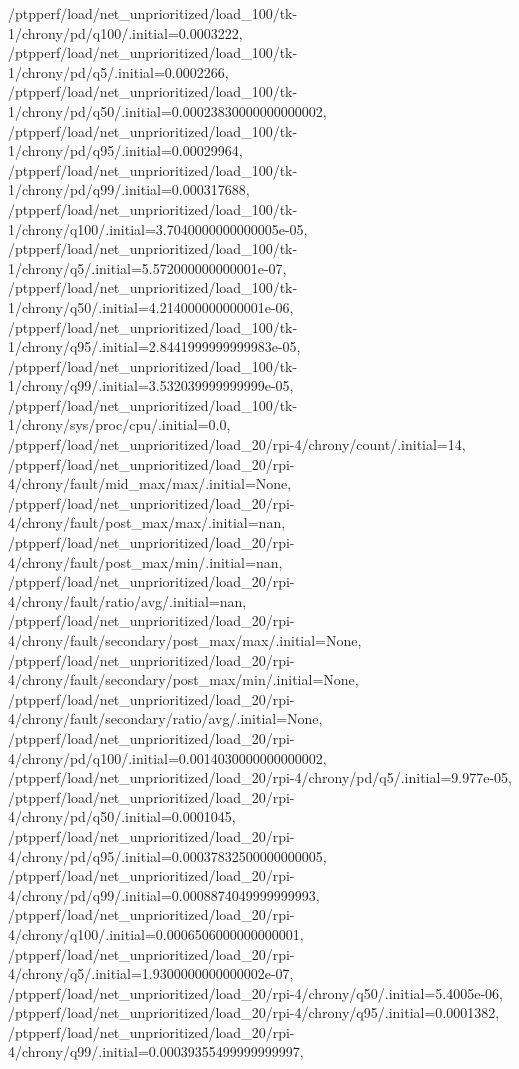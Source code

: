 {    /ptpperf/load/net_unprioritized/load_100/tk-1/chrony/pd/q100/.initial=0.0003222,
    /ptpperf/load/net_unprioritized/load_100/tk-1/chrony/pd/q5/.initial=0.0002266,
    /ptpperf/load/net_unprioritized/load_100/tk-1/chrony/pd/q50/.initial=0.00023830000000000002,
    /ptpperf/load/net_unprioritized/load_100/tk-1/chrony/pd/q95/.initial=0.00029964,
    /ptpperf/load/net_unprioritized/load_100/tk-1/chrony/pd/q99/.initial=0.000317688,
    /ptpperf/load/net_unprioritized/load_100/tk-1/chrony/q100/.initial=3.7040000000000005e-05,
    /ptpperf/load/net_unprioritized/load_100/tk-1/chrony/q5/.initial=5.572000000000001e-07,
    /ptpperf/load/net_unprioritized/load_100/tk-1/chrony/q50/.initial=4.214000000000001e-06,
    /ptpperf/load/net_unprioritized/load_100/tk-1/chrony/q95/.initial=2.8441999999999983e-05,
    /ptpperf/load/net_unprioritized/load_100/tk-1/chrony/q99/.initial=3.532039999999999e-05,
    /ptpperf/load/net_unprioritized/load_100/tk-1/chrony/sys/proc/cpu/.initial=0.0,
    /ptpperf/load/net_unprioritized/load_20/rpi-4/chrony/count/.initial=14,
    /ptpperf/load/net_unprioritized/load_20/rpi-4/chrony/fault/mid_max/max/.initial=None,
    /ptpperf/load/net_unprioritized/load_20/rpi-4/chrony/fault/post_max/max/.initial=nan,
    /ptpperf/load/net_unprioritized/load_20/rpi-4/chrony/fault/post_max/min/.initial=nan,
    /ptpperf/load/net_unprioritized/load_20/rpi-4/chrony/fault/ratio/avg/.initial=nan,
    /ptpperf/load/net_unprioritized/load_20/rpi-4/chrony/fault/secondary/post_max/max/.initial=None,
    /ptpperf/load/net_unprioritized/load_20/rpi-4/chrony/fault/secondary/post_max/min/.initial=None,
    /ptpperf/load/net_unprioritized/load_20/rpi-4/chrony/fault/secondary/ratio/avg/.initial=None,
    /ptpperf/load/net_unprioritized/load_20/rpi-4/chrony/pd/q100/.initial=0.0014030000000000002,
    /ptpperf/load/net_unprioritized/load_20/rpi-4/chrony/pd/q5/.initial=9.977e-05,
    /ptpperf/load/net_unprioritized/load_20/rpi-4/chrony/pd/q50/.initial=0.0001045,
    /ptpperf/load/net_unprioritized/load_20/rpi-4/chrony/pd/q95/.initial=0.00037832500000000005,
    /ptpperf/load/net_unprioritized/load_20/rpi-4/chrony/pd/q99/.initial=0.0008874049999999993,
    /ptpperf/load/net_unprioritized/load_20/rpi-4/chrony/q100/.initial=0.0006506000000000001,
    /ptpperf/load/net_unprioritized/load_20/rpi-4/chrony/q5/.initial=1.9300000000000002e-07,
    /ptpperf/load/net_unprioritized/load_20/rpi-4/chrony/q50/.initial=5.4005e-06,
    /ptpperf/load/net_unprioritized/load_20/rpi-4/chrony/q95/.initial=0.0001382,
    /ptpperf/load/net_unprioritized/load_20/rpi-4/chrony/q99/.initial=0.00039355499999999997,
}

